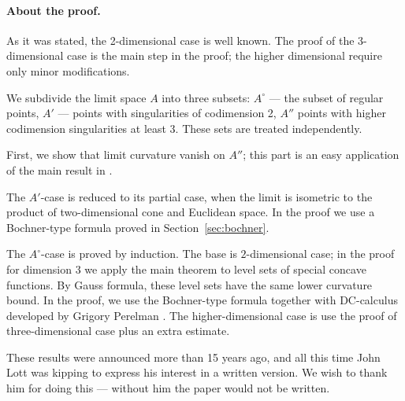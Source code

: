 \paragraph{About the proof.}
As it was stated, the 2-dimensional case is well known.
The proof of the 3-dimensional case is the main step in the proof;
the higher dimensional require only minor modifications.

We subdivide the limit space $A$ into
three subsets: $A^\circ$ --- the subset of regular 
points, $A'$ --- points with singularities of codimension 2,
$A''$ points with higher codimension singularities at least 3.
These sets are treated independently.

First, we show that limit curvature vanish on $A''$; 
this part is an easy application of the main result in \cite{petrunin-SC}.

The $A'$-case is reduced to its partial case, when the limit is isometric to the product of two-dimensional cone and Euclidean space.
In the proof we use a Bochner-type formula proved in Section~\ref{sec:bochner}.

The $A^\circ$-case is proved by induction.
The base is $2$-dimensional case; in the proof for dimension $3$ we apply the main theorem to level sets of special concave functions.
By Gauss formula, these level sets have the same lower curvature bound. 
In the proof, we use the Bochner-type formula together with DC-calculus developed by Grigory Perelman \cite{PerDC}.
The higher-dimensional case is use the proof of three-dimensional case plus an extra estimate.

These results were announced more than 15 years ago, and all this time John Lott was kipping to express his interest in a written version.
We wish to thank him for doing this --- without him the paper would not be written. 
